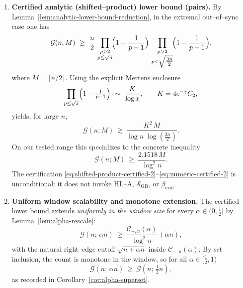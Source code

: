 \documentclass[11pt]{article}
\theoremstyle{inline}
\theoremstyle{break}
\theoremstyle{break}
\theoremstyle{break}
\theoremstyle{break}
\theoremstyle{break}
\theoremstyle{break}
\theoremstyle{break}
\theoremstyle{inline}
\newcommand{\SGB}{\mathcal{S}_{\scriptscriptstyle\mathrm{GB}}}
\newcommand{\betacal}{\beta_{\mathrm{eval}}}
\newcommand{\CminusProductAlpha}[2]{\mathcal{C}_{-,#2}\!\left(#1\right)}
\begin{document}
\begin{enumerate}
  \item \textbf{Certified analytic (shifted–product) lower bound (pairs).}
  By Lemma~\ref{lem:analytic-lower-bound-reduction}, in the extremal out–of–sync case one has
  \begin{equation}\label{eq:shifted-product-certified-2}
    \mathcal{G}(n;M)\ \ge\ \frac{n}{2}\,
    \prod_{\substack{p>2\\ p\le \sqrt{n}}}\!\Bigl(1-\frac{1}{p-1}\Bigr)\,
    \prod_{\substack{p>2\\ p\le \sqrt{\tfrac{3n}{2}}}}\!\Bigl(1-\frac{1}{p-1}\Bigr),
  \end{equation}
  where \( M=\lfloor n/2\rfloor \). Using the explicit Mertens enclosure
  \cite{RosserSchoenfeld1962, Dusart2010, HardyLittlewood1923, MontgomeryVaughan2007}
  \begin{equation}\label{eq:mertens-enclosure-2}
    \prod_{p\le \sqrt{x}}\Bigl(1-\tfrac{1}{p-1}\Bigr)\ \sim\ \frac{K}{\log x},
    \qquad K=4e^{-\gamma}C_2,
  \end{equation}
  yields, for large \(n\),
  \begin{equation}\label{eq:asymp-certified-2}
    \mathcal{G}(n;M)\ \gtrsim\ \frac{K^2\,M}{\log n\;\log(\tfrac{3n}{2})}.
  \end{equation}
  On our tested range this specializes to the concrete inequality
  \begin{equation}\label{eq:numeric-certified-2}
    \mathcal{G}(n;M)\ \ge\ \frac{2.1518\,M}{\log^2 n}.
  \end{equation}
  The certification \eqref{eq:shifted-product-certified-2}–\eqref{eq:numeric-certified-2} is unconditional: it does not invoke HL–A, \( \SGB \), or \( \betacal \).

  \item \textbf{Uniform window scalability and monotone extension.}
  The certified lower bound extends \emph{uniformly in the window size} for every \( \alpha\in(0,\tfrac12] \) by Lemma~\ref{lem:alpha-rescale}:
  \begin{equation}\label{eq:alpha-certified-bridge-2}
    \mathcal{G}(n;\,\alpha n)\ \ge\ \frac{\CminusProductAlpha{\alpha}{n}}{\log^2 n}\,(\alpha n),
  \end{equation}
  with the natural right–edge cutoff \( \sqrt{n+\alpha n} \) inside \( \CminusProductAlpha{\alpha}{n} \).
  By set inclusion, the count is monotone in the window, so for all \( \alpha\in[\tfrac12,1) \)
  \begin{equation}\label{eq:alpha-superset-bridge-2}
    \mathcal{G}(n;\,\alpha n)\ \ge\ \mathcal{G}\!\left(n;\,\tfrac12 n\right),
  \end{equation}
  as recorded in Corollary~\ref{cor:alpha-superset}.


\end{enumerate}
\end{document}
